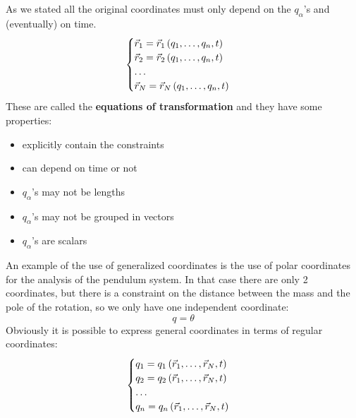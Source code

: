 As we stated all the original coordinates must only depend on the $q_{\alpha}$'s and (eventually) on time.
\begin{equation} \label{equations_of_transformation}
    \begin{cases}
        \vec{r}_1 = \vec{r}_1\left(q_1,\dots,q_n,t\right)\\
        \vec{r}_2 = \vec{r}_2\left(q_1,\dots,q_n,t\right)\\
        \dots \\
        \vec{r}_N = \vec{r}_N\left(q_1,\dots,q_n,t\right)
    \end{cases}
\end{equation}
These are called the \textbf{equations of transformation} and they have some properties:
\begin{itemize}
    \item explicitly contain the constraints
    \item can depend on time or not
    \item $q_{\alpha}$'s may not be lengths
    \item $q_{\alpha}$'s may not be grouped in vectors
    \item $q_{\alpha}$'s are scalars
\end{itemize}
An example of the use of generalized coordinates is the use of polar coordinates for the analysis of the pendulum system. In that case there are only 2 coordinates, but there is a constraint on the distance between the mass and the pole of the rotation, so we only have one independent coordinate:
\[q=\theta\]
Obviously it is possible to express general coordinates in terms of regular coordinates:
\begin{equation} \label{inverse_equations_of_transformation}
    \begin{cases}
        q_1 = q_1\left(\vec{r}_1,\dots,\vec{r}_N,t\right)\\
        q_2 = q_2\left(\vec{r}_1,\dots,\vec{r}_N,t\right)\\
        \dots \\
        q_n = q_n\left(\vec{r}_1,\dots,\vec{r}_N,t\right)
    \end{cases}
\end{equation}
